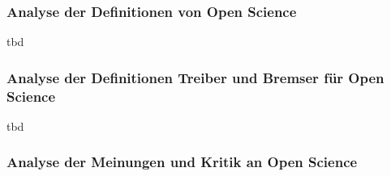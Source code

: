 \subsubsection{Analyse der Definitionen von Open Science} 
tbd

\subsubsection{Analyse der Definitionen Treiber und Bremser für Open Science} 
tbd

\subsubsection{Analyse der Meinungen und Kritik an Open Science}
